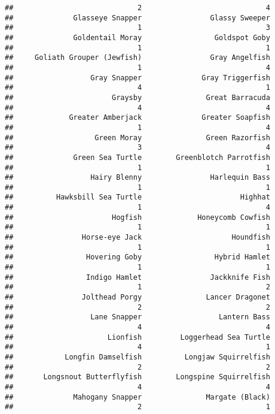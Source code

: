 \documentclass[
]{article}
\begin{document}
\begin{verbatim}
##                             2                             4 
##              Glasseye Snapper                Glassy Sweeper 
##                             1                             3 
##              Goldentail Moray                 Goldspot Goby 
##                             1                             1 
##     Goliath Grouper (Jewfish)                Gray Angelfish 
##                             1                             4 
##                  Gray Snapper              Gray Triggerfish 
##                             4                             1 
##                       Graysby               Great Barracuda 
##                             4                             4 
##             Greater Amberjack              Greater Soapfish 
##                             1                             4 
##                   Green Moray               Green Razorfish 
##                             3                             4 
##              Green Sea Turtle        Greenblotch Parrotfish 
##                             1                             1 
##                  Hairy Blenny                Harlequin Bass 
##                             1                             1 
##          Hawksbill Sea Turtle                       Highhat 
##                             1                             4 
##                       Hogfish             Honeycomb Cowfish 
##                             1                             1 
##                Horse-eye Jack                     Houndfish 
##                             1                             1 
##                 Hovering Goby                 Hybrid Hamlet 
##                             1                             1 
##                 Indigo Hamlet                Jackknife Fish 
##                             1                             2 
##                Jolthead Porgy               Lancer Dragonet 
##                             2                             2 
##                  Lane Snapper                  Lantern Bass 
##                             4                             4 
##                      Lionfish         Loggerhead Sea Turtle 
##                             4                             1 
##            Longfin Damselfish          Longjaw Squirrelfish 
##                             2                             2 
##       Longsnout Butterflyfish        Longspine Squirrelfish 
##                             4                             4 
##              Mahogany Snapper               Margate (Black) 
##                             2                             1 

\end{verbatim}
\end{document}
